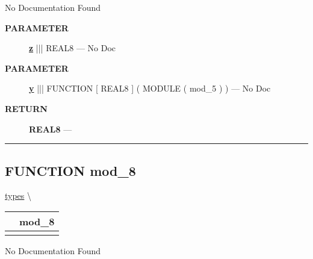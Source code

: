 \par





No Documentation Found






\par
\begin{description}
\item [\colorbox{tagtype}{\color{white} \textbf{\textsf{PARAMETER}}}] \textbf{\underline{z}} ||| REAL8 --- No Doc
\item [\colorbox{tagtype}{\color{white} \textbf{\textsf{PARAMETER}}}] \textbf{\underline{y}} ||| FUNCTION [ REAL8 ] ( MODULE ( mod\_5 ) ) --- No Doc
\end{description}







\par
\begin{description}
\item [\colorbox{tagtype}{\color{white} \textbf{\textsf{RETURN}}}] \textbf{REAL8} --- 
\end{description}




\rule{\linewidth}{0.5pt}
\subsection*{\textsf{\colorbox{headtoc}{\color{white} FUNCTION}
mod\_8}}

\hypertarget{ecldoc:types.mod_8}{}
\hspace{0pt} \hyperlink{ecldoc:types}{types} \textbackslash 

{\renewcommand{\arraystretch}{1.5}
\begin{tabularx}{\textwidth}{|>{\raggedright\arraybackslash}l|X|}
\hline
\hspace{0pt}\mytexttt{\color{red} } & \textbf{mod\_8} \\
\hline
\multicolumn{2}{|>{\raggedright\arraybackslash}X|}{\hspace{0pt}\mytexttt{\color{param} (mod\_3 a1)}} \\
\hline
\end{tabularx}
}

\par





No Documentation Found






